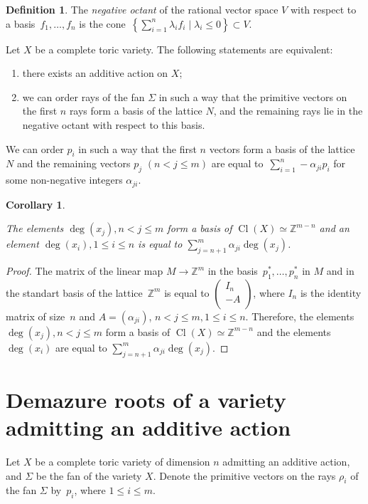 \documentclass[a4paper,reqno,12pt]{amsart}
\DeclareMathOperator {\Cl}{Cl}
\def\Z  {\mathbb Z}
\newtheorem{corollary}{Corollary}
\theoremstyle{definition}
\newtheorem{defn}{Definition}
\begin{document}
\begin{defn}
  The \emph{negative octant} of the rational vector space $V$ with respect to a basis~${f_1, \ldots, f_n}$ is the cone~${\left\{\sum\limits_{i=1}^n \lambda_i f_i \mid \lambda_i \leq 0\right\} \subset V}$.
\end{defn}
\begin{stm}{\cite[Proposition 1]{S}}\label{ort}
  Let $X$ be a complete toric variety.
  The following statements are equivalent:
  \begin{enumerate}
  \item there exists an additive action on $X$;
  \item we can order rays of the fan $\Sigma$ in such a way that the primitive vectors on the first $n$ rays form a basis of the lattice $N$, and the remaining rays lie in the negative octant with respect to this basis.
  \end{enumerate}
\end{stm}
  We can order $p_i$ in such a way that the first $n$ vectors form a basis of the lattice $N$ and the remaining vectors $p_j$ $(n < j \leq m)$ are equal to~$\sum_{i=1}^n-\alpha_{ji} p_i$ for some non-negative integers $\alpha_{ji}$.
\begin{corollary}\label{clbasis}

  The elements $\deg(x_j), n<j\leq m$ form a basis of $\Cl(X)\simeq \Z^{m-n}$
  and
  an element $\deg(x_i), 1\leq i \leq n$ is equal to $\sum\limits_{j=n+1}^m \alpha_{ji}\deg(x_j)$.
\end{corollary}
\begin{proof}
  The matrix of the linear map $M\rightarrow \Z^m$   in the basis~$p_1^*, \ldots, p_n^*$  in $M$ and in the standart basis of the lattice~${\Z^m}$ is equal to
  $
    \left(
      \begin{array}{c}
      I_{n}\\
      -A\\
      \end{array}
    \right)
    $,
  where $I_n$ is the identity matrix of size~$n$ and $A=(\alpha_{ji})$, $n< j\leq m, 1\leq i\leq n$.
Therefore, the elements $\deg(x_j), n<j\leq m$ form a basis of $\Cl(X)\simeq \Z^{m-n}$
  and
  the elements $\deg(x_i)$ are equal to $\sum\limits_{j=n+1}^m \alpha_{ji}\deg(x_j)$.
  
\end{proof}
\section{Demazure roots of a variety admitting an additive action}\label{draa}
Let $X$ be a complete toric variety of dimension $n$ admitting an additive action, and $\Sigma$ be the fan of the variety $X$.
Denote the primitive vectors on the rays $\rho_i$ of the fan $\Sigma$ by~$p_i$, where $1 \leq i \leq m$.
\end{document}

